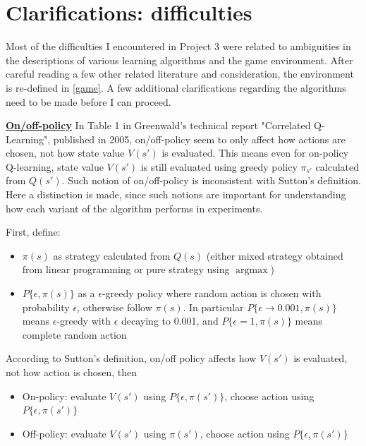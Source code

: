 \documentclass[10pt]{article}
\DeclareMathOperator*{\argmax}{argmax} %
\begin{document}
\section{Clarifications: difficulties} \label{clarification}
Most of the difficulties I encountered in Project 3 were related to ambiguities in the descriptions of various learning algorithms and the game environment. After careful reading a few other related literature and consideration, the environment is re-defined in \ref{game}. A few additional clarifications regarding the algorithms need to be made before I can proceed.\par
\bigbreak
\noindent
\ul{\textbf{On/off-policy}} In Table 1 in Greenwald's technical report "Correlated Q-Learning", published in 2005\cite{GreenwaldCorrelatedQLearning2005}, on/off-policy seem to only affect how actions are chosen, not how state value $V(s')$ is evaluated. This means even for on-policy Q-learning, state value $V(s')$ is still evaluated using greedy policy $\pi_{s'}$ calculated from $Q(s')$. Such notion of on/off-policy is inconsistent with Sutton's definition\cite{SuttonReinforcementLearningIntroduction1998}. Here a distinction is made, since such notions are important for understanding how each variant of the algorithm performs in experiments.\par
\bigbreak
\noindent
First, define:
\begin{itemize}
   \item $\pi(s)$ as strategy calculated from $Q(s)$ (either mixed strategy obtained from linear programming or pure strategy using $\argmax$)
   \item $P\{\epsilon, \pi(s)\}$ as a $\epsilon$-greedy policy where random action is chosen with probability $\epsilon$, otherwise follow $\pi(s)$. In particular $P\{\epsilon\rightarrow 0.001, \pi(s)\}$ means $\epsilon$-greedy with $\epsilon$ decaying to 0.001, and $P\{\epsilon=1, \pi(s)\}$ means complete random action
\end{itemize}

 
\noindent
According to Sutton's definition\cite{SuttonReinforcementLearningIntroduction1998},  on/off policy affects how $V(s')$ is evaluated, not how action is chosen, then
\begin{itemize}
   \item On-policy: evaluate $V(s')$ using $P\{\epsilon, \pi(s')\}$, choose action using $P\{\epsilon, \pi(s')\}$
  \item Off-policy: evaluate $V(s')$ using $\pi(s')$, choose action using $P\{\epsilon, \pi(s')\}$
\end{itemize}
\end{document}
